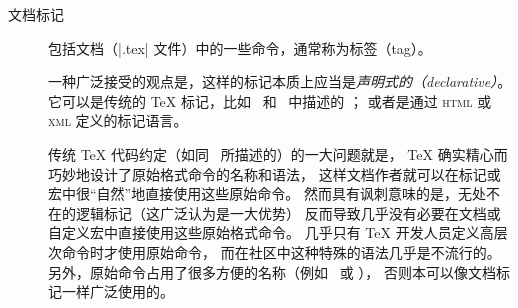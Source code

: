 \documentclass[full]{l3doc}
\providecommand\acro[1]{\textsc{\MakeLowercase{#1}}}
\begin{document}
\begin{description}
%
\item[文档标记] 包括文档（|.tex| 文件）中的一些命令，通常称为标签（tag）。

%
一种广泛接受的观点是，这样的标记本质上应当是\emph{声明式的（declarative）}。
它可以是传统的 \TeX{} 标记，比如~\cite{A-W:LLa94} 和~\cite{A-W:GMS94} 中描述的 \LaTeXe{}；
或者是通过 \acro{HTML} 或 \acro{XML} 定义的标记语言。

传统 \TeX{} 代码约定（如同~\cite{A-W:K-TB} 所描述的）的一大问题就是，
\TeX{} 确实精心而巧妙地设计了原始格式命令的名称和语法，
这样文档作者就可以在标记或宏中很“自然”地直接使用这些原始命令。
然而具有讽刺意味的是，无处不在的逻辑标记（这广泛认为是一大优势）
反而导致几乎没有必要在文档或自定义宏中直接使用这些原始格式命令。
几乎只有 \TeX{} 开发人员定义高层次命令时才使用原始命令，
而在社区中这种特殊的语法几乎是不流行的。
另外，原始命令占用了很多方便的名称（例如~ 或 ），
否则本可以像文档标记一样广泛使用的。

%
%


\end{description}
\end{document}
